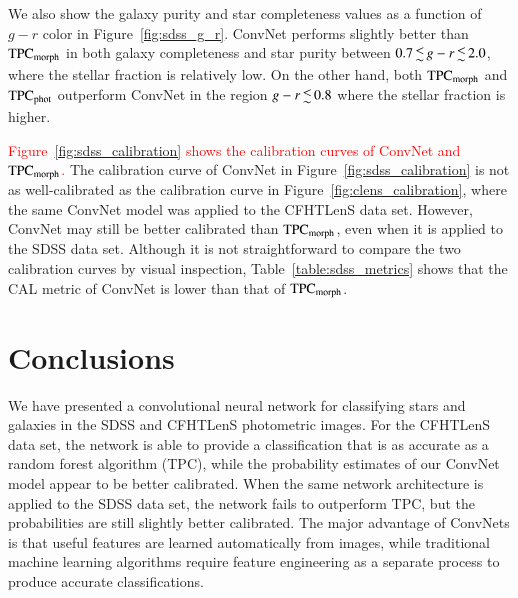 \documentclass[fleqn,usenatbib]{mnras}
\newcommand{\changed}[1]{\textcolor{red}{#1}}
\begin{document}
We also show the galaxy purity and star completeness values as a function of
$g-r$ color in Figure~\ref{fig:sdss_g_r}.
ConvNet performs slightly better than ${\mathrm{TPC}}_{{\mathrm{morph}}}$ in both
galaxy completeness and star purity between $0.7 \la g-r \la 2.0$,
where the stellar fraction is relatively low.
On the other hand, both ${\mathrm{TPC}}_{{\mathrm{morph}}}$ and ${\mathrm{TPC}}_{{\mathrm{phot}}}$ outperform
ConvNet in the region $g-r \la 0.8$ where the stellar fraction is higher.

\changed{
Figure~\ref{fig:sdss_calibration} shows
the calibration curves of ConvNet and ${\mathrm{TPC}}_{{\mathrm{morph}}}$.
}
The calibration curve of ConvNet in Figure~\ref{fig:sdss_calibration}
is not as well-calibrated as the calibration curve in
Figure~\ref{fig:clens_calibration},
where the same ConvNet model was applied to the CFHTLenS data set.
However, ConvNet may still be better calibrated than ${\mathrm{TPC}}_{{\mathrm{morph}}}$,
even when it is applied to the SDSS data set.
Although it is not straightforward to compare the two calibration curves by
visual inspection, Table~\ref{table:sdss_metrics} shows that the CAL metric of
ConvNet is lower than that of ${\mathrm{TPC}}_{{\mathrm{morph}}}$.



\section{Conclusions}
  \label{sec:conclusions}

We have presented a convolutional neural network for classifying stars and
galaxies in the SDSS and CFHTLenS photometric images.
For the CFHTLenS data set, the network is able to provide a classification that
is as accurate as a random forest algorithm (TPC), while the probability estimates of
our ConvNet model appear to be better calibrated.
When the same network architecture is applied to the SDSS data set,
the network fails to outperform TPC,
but the probabilities are still slightly better calibrated.
The major advantage of ConvNets is that useful features are learned
automatically from images, while traditional machine learning
algorithms require feature engineering as a separate process
to produce accurate classifications.
\end{document}
